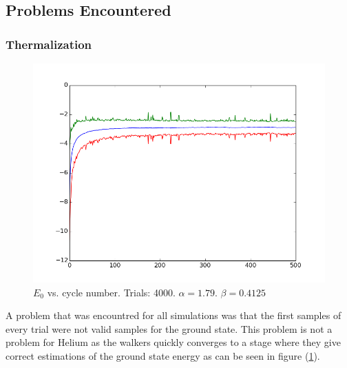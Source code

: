 \documentclass[twocolumn,fleqn,8pt]{article}  %
\begin{document}
\subsection{Problems Encountered}
\subsubsection{Thermalization}
\begin{figure}
	\includegraphics[width=\columnwidth]{../res/plot/helium_04/helium_04.png}
	\caption[caption]{$E_0$ vs. cycle number. 
	 	Trials: 4000. $\alpha = 1.79$. 
	$\beta = 0.4125$}
	\label{fig:helium_04}
\end{figure}
A problem that was encountred for all simulations was that the first samples of every 
trial were not valid samples for the ground state. This problem is not a problem for
Helium as the walkers quickly converges to a stage where they give correct
estimations of the ground state energy
as can be seen in figure (\ref{fig:helium_04}). 
\end{document}
